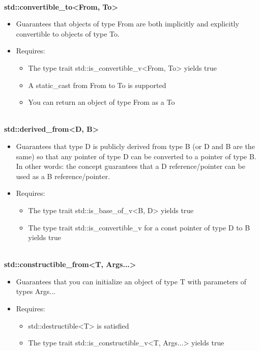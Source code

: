 \noindent
\hspace*{\fill} \\ %
\textbf{std::convertible\_to<From, To>}

\begin{itemize}
\item
Guarantees that objects of type From are both implicitly and explicitly convertible to objects of type To.

\item
Requires:
\begin{itemize}
\item
The type trait std::is\_convertible\_v<From, To> yields true

\item
A static\_cast from From to To is supported

\item
You can return an object of type From as a To
\end{itemize}
\end{itemize}

\noindent
\hspace*{\fill} \\ %
\textbf{std::derived\_from<D, B>}

\begin{itemize}
\item
Guarantees that type D is publicly derived from type B (or D and B are the same) so that any pointer of type D can be converted to a pointer of type B. In other words: the concept guarantees that a D reference/pointer can be used as a B reference/pointer.

\item
Requires:
\begin{itemize}
\item
The type trait std::is\_base\_of\_v<B, D> yields true

\item
The type trait std::is\_convertible\_v for a const pointer of type D to B yields true
\end{itemize}
\end{itemize}

\noindent
\hspace*{\fill} \\ %
\textbf{std::constructible\_from<T, Args...>}

\begin{itemize}
\item
Guarantees that you can initialize an object of type T with parameters of types Args...

\item
Requires:
\begin{itemize}
\item
std::destructible<T> is satisfied

\item
The type trait std::is\_constructible\_v<T, Args...> yields true
\end{itemize}
\end{itemize}

